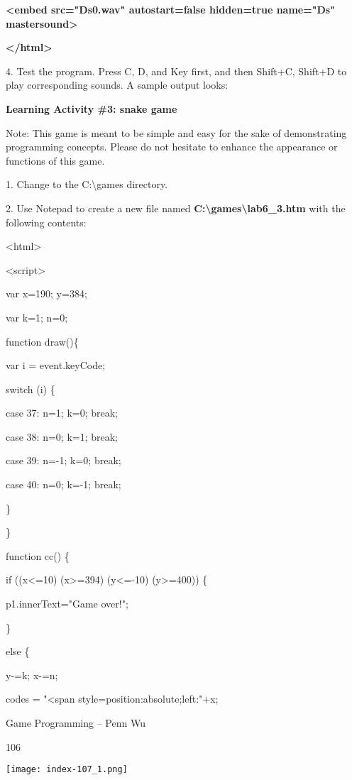 \documentclass[
]{article}
\begin{document}
\textbf{\textless embed src="Ds0.wav" autostart=false hidden=true
name="Ds" mastersound\textgreater{}}

\textbf{}

\textbf{\textless/html\textgreater{}}

4. Test the program. Press C, D, and Key first, and then Shift+C,
Shift+D to play corresponding sounds. A sample output looks:

\textbf{Learning Activity \#3: snake game}

Note: This game is meant to be simple and easy for the sake of
demonstrating programming concepts. Please do not hesitate to enhance
the appearance or functions of this game.

1. Change to the C:\textbackslash games directory.

2. Use Notepad to create a new file named
\textbf{C:\textbackslash games\textbackslash lab6\_3.htm} with the
following contents:

\textless html\textgreater{}

\textless script\textgreater{}

var x=190; y=384;

var k=1; n=0;

function draw()\{

var i = event.keyCode;

switch (i) \{

case 37: n=1; k=0; break;

case 38: n=0; k=1; break;

case 39: n=-1; k=0; break;

case 40: n=0; k=-1; break;

\}

\}

function cc() \{

if ((x\textless=10) \textbar\textbar{} (x\textgreater=394)
\textbar\textbar{} (y\textless=-10) \textbar\textbar{}
(y\textgreater=400)) \{

p1.innerText="Game over!";

\}

else \{

y-=k; x-=n;

codes = "\textless span
style=\textquotesingle position:absolute;left:"+x;

Game Programming -- Penn Wu

106

\protect\hypertarget{index_split_007.htmlux5cux23p107}{}{}\texttt{[image: index-107\_1.png]}
\end{document}
